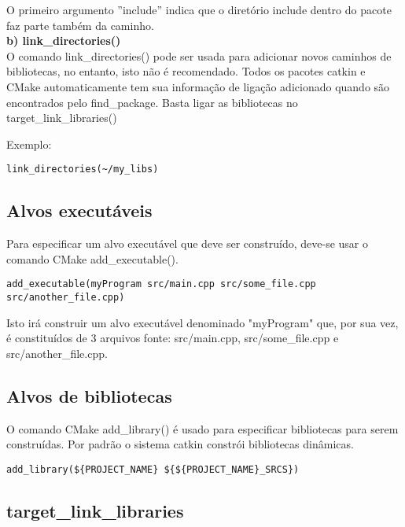 O primeiro argumento ''include'' indica que o diretório include dentro do pacote faz parte também da caminho. \\

\textbf{b) link\_directories()} \\

O comando link\_directories() pode ser usada para adicionar novos caminhos de bibliotecas, no entanto, isto não é recomendado. Todos os pacotes catkin e CMake automaticamente tem sua informação de ligação adicionado quando são encontrados pelo find\_package. 
Basta ligar as bibliotecas no target\_link\_libraries()

Exemplo:

\begin{verbatim}
link_directories(~/my_libs)
\end{verbatim}

\subsection{Alvos executáveis}

Para especificar um alvo executável que deve ser construído, deve-se usar o comando CMake add\_executable().

\begin{verbatim}
add_executable(myProgram src/main.cpp src/some_file.cpp src/another_file.cpp)
\end{verbatim}

Isto irá construir um alvo executável denominado "myProgram" que, por sua vez, é constituídos de 3 arquivos fonte: src/main.cpp, src/some\_file.cpp e src/another\_file.cpp.

\subsection{Alvos de bibliotecas}

O comando CMake add\_library() é usado para especificar bibliotecas para serem construídas. Por padrão o sistema catkin constrói bibliotecas dinâmicas.

\begin{verbatim}
add_library(${PROJECT_NAME} ${${PROJECT_NAME}_SRCS})
\end{verbatim}

\subsection{target\_link\_libraries}

